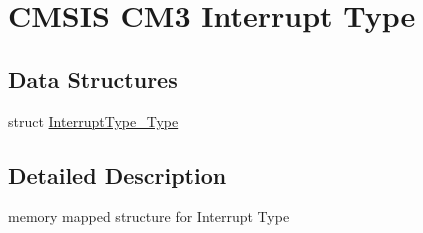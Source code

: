 \hypertarget{group___c_m_s_i_s___c_m3___interrupt_type}{\section{C\-M\-S\-I\-S C\-M3 Interrupt Type}
\label{group___c_m_s_i_s___c_m3___interrupt_type}
}
\subsection*{Data Structures}
\begin{DoxyCompactItemize}
\item 
struct \hyperlink{struct_interrupt_type___type}{Interrupt\-Type\-\_\-\-Type}
\end{DoxyCompactItemize}


\subsection{Detailed Description}
memory mapped structure for Interrupt Type 